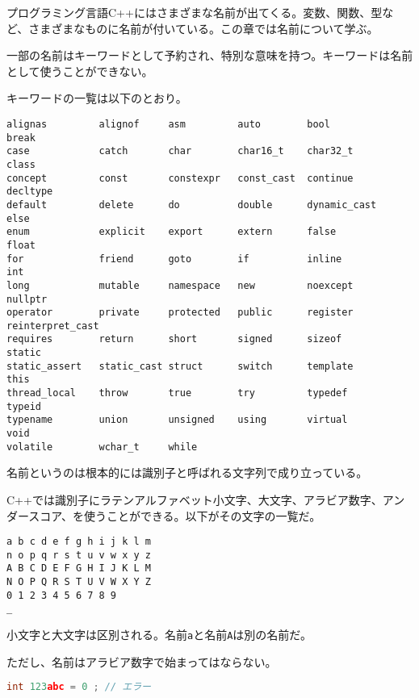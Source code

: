 
プログラミング言語C++にはさまざまな名前が出てくる。変数、関数、型など、さまざまなものに名前が付いている。この章では名前について学ぶ。


一部の名前はキーワードとして予約され、特別な意味を持つ。キーワードは名前として使うことができない。

キーワードの一覧は以下のとおり。

\begin{lstlisting}[style=grammar]
alignas         alignof     asm         auto        bool            break
case            catch       char        char16_t    char32_t        class
concept         const       constexpr   const_cast  continue        decltype
default         delete      do          double      dynamic_cast    else
enum            explicit    export      extern      false           float
for             friend      goto        if          inline          int
long            mutable     namespace   new         noexcept        nullptr
operator        private     protected   public      register        reinterpret_cast
requires        return      short       signed      sizeof          static
static_assert   static_cast struct      switch      template        this
thread_local    throw       true        try         typedef         typeid
typename        union       unsigned    using       virtual         void
volatile        wchar_t     while
\end{lstlisting}


名前というのは根本的には識別子と呼ばれる文字列で成り立っている。

C++では識別子にラテンアルファベット小文字、大文字、アラビア数字、アンダースコア、を使うことができる。以下がその文字の一覧だ。

\begin{lstlisting}[style=grammar]
a b c d e f g h i j k l m
n o p q r s t u v w x y z
A B C D E F G H I J K L M
N O P Q R S T U V W X Y Z
0 1 2 3 4 5 6 7 8 9
_
\end{lstlisting}

小文字と大文字は区別される。名前\texttt{a}と名前\texttt{A}は別の名前だ。

ただし、名前はアラビア数字で始まってはならない。

\begin{lstlisting}[language={C++}]
int 123abc = 0 ; // エラー
\end{lstlisting}

